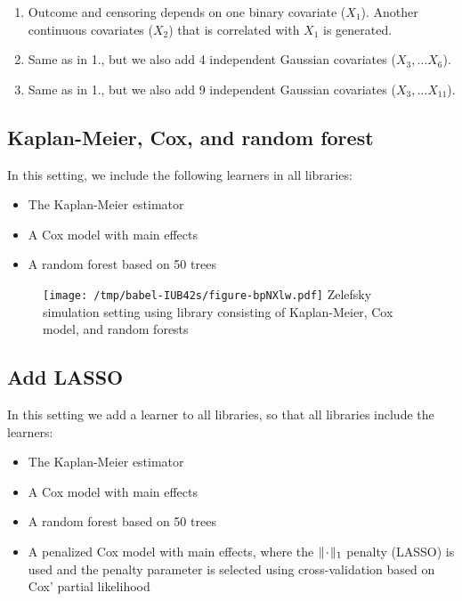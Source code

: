 \documentclass[a4paper,danish]{article}
\begin{document}
\begin{enumerate}
\item Outcome and censoring depends on one binary covariate (\(X_1\)). Another
continuous covariates (\(X_2\)) that is correlated with \(X_1\) is generated.
\item Same as in 1., but we also add 4 independent Gaussian covariates (\(X_3,
   \dots X_6\)).
\item Same as in 1., but we also add 9 independent Gaussian covariates (\(X_3,
   \dots X_{11}\)).
\end{enumerate}

\subsection{Kaplan-Meier, Cox, and random forest}
\label{sec:org493c472}
In this setting, we include the following learners in all libraries:

\begin{itemize}
\item The Kaplan-Meier estimator
\item A Cox model with main effects
\item A random forest based on 50 trees
\end{itemize}

\begin{figure}[htbp]
\centering
\texttt{[image: /tmp/babel-IUB42s/figure-bpNXlw.pdf]}
Zelefsky simulation setting using library consisting of Kaplan-Meier, Cox model, and random forests
\end{figure}

\clearpage

\subsection{Add LASSO}
\label{sec:org8fb1981}
In this setting we add a learner to all libraries, so that all libraries include
the learners:

\begin{itemize}
\item The Kaplan-Meier estimator
\item A Cox model with main effects
\item A random forest based on 50 trees
\item A penalized Cox model with main effects, where the \(\|\blank\|_1\) penalty
(LASSO) is used and the penalty parameter is selected using cross-validation
based on Cox' partial likelihood
\end{itemize}
\end{document}
